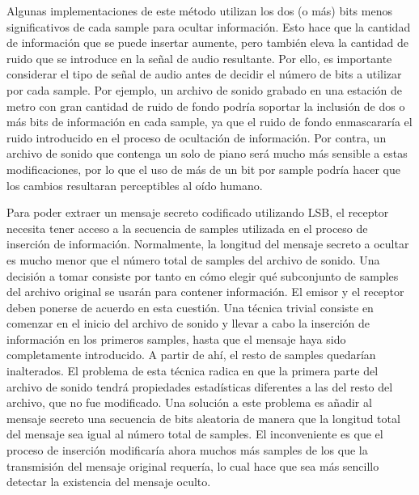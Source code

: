 \documentclass[12pt]{article}
\begin{document}
Algunas implementaciones de este método utilizan los dos (o más) bits menos significativos de cada sample para ocultar información. Esto hace que la cantidad de información que se puede insertar aumente, pero también eleva la cantidad de ruido que se introduce en la señal de audio resultante. Por ello, es importante considerar el tipo de señal de audio antes de decidir el número de bits a utilizar por cada sample. Por ejemplo, un archivo de sonido grabado en una estación de metro con gran cantidad de ruido de fondo podría soportar la inclusión de dos o más bits de información en cada sample, ya que el ruido de fondo enmascararía el ruido introducido en el proceso de ocultación de información. Por contra, un archivo de sonido que contenga un solo de piano será mucho más sensible a estas modificaciones, por lo que el uso de más de un bit por sample podría hacer que los cambios resultaran perceptibles al oído humano.

Para poder extraer un mensaje secreto codificado utilizando LSB, el receptor necesita tener acceso a la secuencia de samples utilizada en el proceso de inserción de información. Normalmente, la longitud del mensaje secreto a ocultar es mucho menor que el número total de samples del archivo de sonido. Una decisión a tomar consiste por tanto en cómo elegir qué subconjunto de samples del archivo original se usarán para contener información. El emisor y el receptor deben ponerse de acuerdo en esta cuestión. Una técnica trivial consiste en comenzar en el inicio del archivo de sonido y llevar a cabo la inserción de información en los primeros samples, hasta que el mensaje haya sido completamente introducido. A partir de ahí, el resto de samples quedarían inalterados. El problema de esta técnica radica en que la primera parte del archivo de sonido tendrá propiedades estadísticas diferentes a las del resto del archivo, que no fue modificado. Una solución a este problema es añadir al mensaje secreto una secuencia de bits aleatoria de manera que la longitud total del mensaje sea igual al número total de samples. El inconveniente es que el proceso de inserción modificaría ahora muchos más samples de los que la transmisión del mensaje original requería, lo cual hace que sea más sencillo detectar la existencia del mensaje oculto.
\end{document}

